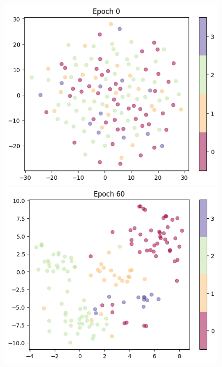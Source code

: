 \documentclass[notes, 10pt, aspectratio=169]{beamer}
\begin{document}
\begin{frame}
   \begin{columns}
       \begin{column}{0.33\textwidth}
           \centering
           \includegraphics[width=0.9\textwidth]{./graphics/epoch0.png}
           \includegraphics[width=0.9\textwidth]{./graphics/epoch60.png}
       \end{column}
       \begin{column}{0.33\textwidth}
           \centering

\end{column}
\end{columns}
\end{frame}
\end{document}
